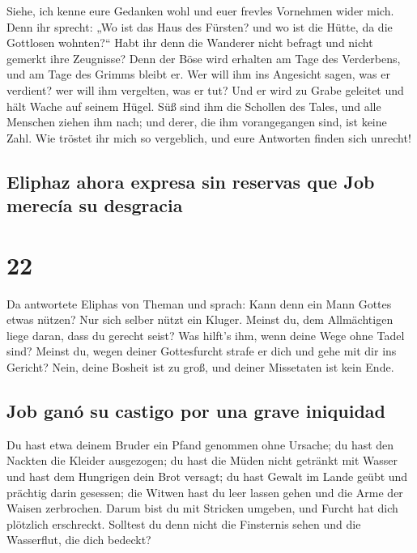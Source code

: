  Siehe, ich kenne eure Gedanken wohl und euer frevles
Vornehmen wider mich.  Denn ihr sprecht: „Wo ist das Haus
des Fürsten? und wo ist die Hütte, da die Gottlosen wohnten?{}``
 Habt ihr denn die Wanderer nicht befragt und nicht
gemerkt ihre Zeugnisse?  Denn der Böse wird erhalten am
Tage des Verderbens, und am Tage des Grimms bleibt er. 
Wer will ihm ins Angesicht sagen, was er verdient? wer will ihm
vergelten, was er tut?  Und er wird zu Grabe geleitet und
hält Wache auf seinem Hügel.  Süß sind ihm die Schollen
des Tales, und alle Menschen ziehen ihm nach; und derer, die ihm
vorangegangen sind, ist keine Zahl.  Wie tröstet ihr mich
so vergeblich, und eure Antworten finden sich unrecht!

\hypertarget{eliphaz-ahora-expresa-sin-reservas-que-job-merecuxeda-su-desgracia}{%
\subsection{Eliphaz ahora expresa sin reservas que Job merecía su
desgracia}\label{eliphaz-ahora-expresa-sin-reservas-que-job-merecuxeda-su-desgracia}}

\hypertarget{section-21}{%
\section{22}\label{section-21}}

 Da antwortete Eliphas von Theman und sprach:
 Kann denn ein Mann Gottes etwas nützen? Nur sich selber
nützt ein Kluger.  Meinst du, dem Allmächtigen liege
daran, dass du gerecht seist? Was hilft's ihm, wenn deine Wege ohne
Tadel sind?  Meinst du, wegen deiner Gottesfurcht strafe
er dich und gehe mit dir ins Gericht?  Nein, deine Bosheit
ist zu groß, und deiner Missetaten ist kein Ende.

\hypertarget{job-ganuxf3-su-castigo-por-una-grave-iniquidad}{%
\subsection{Job ganó su castigo por una grave
iniquidad}\label{job-ganuxf3-su-castigo-por-una-grave-iniquidad}}

 Du hast etwa deinem Bruder ein Pfand genommen ohne
Ursache; du hast den Nackten die Kleider ausgezogen;  du
hast die Müden nicht getränkt mit Wasser und hast dem Hungrigen dein
Brot versagt;  du hast Gewalt im Lande geübt und prächtig
darin gesessen;  die Witwen hast du leer lassen gehen und
die Arme der Waisen zerbrochen.  Darum bist du mit
Stricken umgeben, und Furcht hat dich plötzlich erschreckt.
 Solltest du denn nicht die Finsternis sehen und die
Wasserflut, die dich bedeckt?


